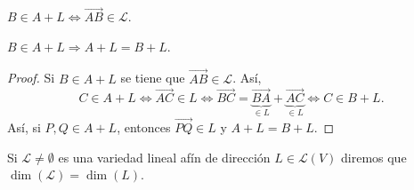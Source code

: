 \begin{observation}
	\normalfont $\displaystyle B \in A + L \iff \overrightarrow{AB} \in \mathcal{L}$.
\end{observation}
\begin{fprop}[]
\normalfont $\displaystyle B \in A + L \Rightarrow A + L = B + L $.
\end{fprop}
\begin{proof}
	Si $\displaystyle B \in A + L $ se tiene que $\displaystyle \overrightarrow{AB} \in \mathcal{L} $. Así,
	\[ C \in A + L \iff \overrightarrow{AC} \in L \iff \overrightarrow{BC} = \underbrace{\overrightarrow{BA}}_{\in L} + \underbrace{\overrightarrow{AC}}_{\in L} \iff C \in B + L .\]
	Así, si $\displaystyle P,Q \in A+L $, entonces $\displaystyle \overrightarrow{PQ} \in L $ y $\displaystyle A + L = B + L $.
\end{proof}
\begin{fdefinition}[]
\normalfont Si $\displaystyle \mathcal{L} \neq \emptyset $ es una variedad lineal afín de dirección $\displaystyle L \in \mathcal{L}\left(V\right) $ diremos que $\displaystyle \dim\left(\mathcal{L}\right) = \dim\left(L\right) $.
\end{fdefinition}

